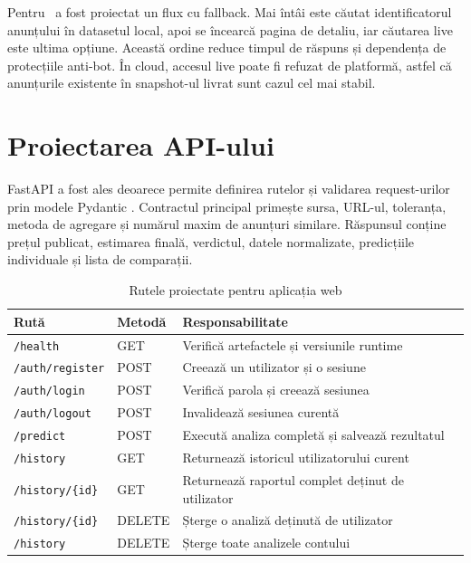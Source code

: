 
Pentru \mobilede\ a fost proiectat un flux cu fallback. Mai întâi este căutat identificatorul anunțului în datasetul local, apoi se încearcă pagina de detaliu, iar căutarea live este ultima opțiune. Această ordine reduce timpul de răspuns și dependența de protecțiile anti-bot. În cloud, accesul live poate fi refuzat de platformă, astfel că anunțurile existente în snapshot-ul livrat sunt cazul cel mai stabil.

\section{Proiectarea API-ului}
\label{sec:app-api}

FastAPI a fost ales deoarece permite definirea rutelor și validarea request-urilor prin modele Pydantic \cite{fastapi_docs}. Contractul principal primește sursa, URL-ul, toleranța, metoda de agregare și numărul maxim de anunțuri similare. Răspunsul conține prețul publicat, estimarea finală, verdictul, datele normalizate, predicțiile individuale și lista de comparații.

\begin{table}[H]
    \centering
    \caption{Rutele proiectate pentru aplicația web}
    \label{tab:api-routes}
    \begin{tabular}{@{}p{3.3cm}p{1.6cm}p{7.1cm}@{}}
        \toprule
        Rută & Metodă & Responsabilitate \\
        \midrule
        \texttt{/health} & GET & Verifică artefactele și versiunile runtime \\
        \texttt{/auth/register} & POST & Creează un utilizator și o sesiune \\
        \texttt{/auth/login} & POST & Verifică parola și creează sesiunea \\
        \texttt{/auth/logout} & POST & Invalidează sesiunea curentă \\
        \texttt{/predict} & POST & Execută analiza completă și salvează rezultatul \\
        \texttt{/history} & GET & Returnează istoricul utilizatorului curent \\
        \texttt{/history/\{id\}} & GET & Returnează raportul complet deținut de utilizator \\
        \texttt{/history/\{id\}} & DELETE & Șterge o analiză deținută de utilizator \\
        \texttt{/history} & DELETE & Șterge toate analizele contului \\
        \bottomrule
    \end{tabular}
\end{table}

